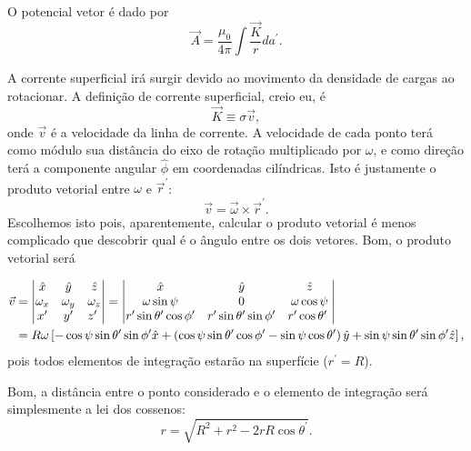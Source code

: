 \documentclass{article}
\newcommand{\rcaligrafico}{r}
\begin{document}
O potencial vetor é dado por
\begin{equation}
 \vec{A} = \frac{\mu_0}{4 \pi} \int \frac{\vec{K}}{\rcaligrafico} da^{\prime}.
\end{equation}

A corrente superficial irá surgir devido ao movimento da densidade de cargas ao rotacionar. A definição de corrente superficial, creio eu, é
\begin{equation}
 \vec{K} \equiv \sigma \vec{v},
\end{equation}
onde $\vec{v}$ é a velocidade da linha de corrente. A velocidade de cada ponto terá como módulo sua distância do eixo de rotação multiplicado por $\omega$, e como direção
terá a componente angular $\hat{\phi}$ em coordenadas cilíndricas. Isto é justamente o produto vetorial entre $\omega$ e $\vec{r}^{\prime}$:
\begin{equation}
 \vec{v} = \vec{\omega} \times \vec{r}^{\prime}.
\end{equation}
Escolhemos isto pois, aparentemente, calcular o produto vetorial é menos complicado que descobrir qual é o ângulo entre os dois vetores. Bom, o produto vetorial será

\begin{align}
\vec{v} &=
\begin{vmatrix}
\hat{x} & \hat{y} & \hat{z} \\ 
\omega_x & \omega_y & \omega_z \\ 
x^{\prime} & y^{\prime} & z^{\prime} \ \notag
\end{vmatrix}
=
\begin{vmatrix}
\hat{x} & \hat{y} & \hat{z} \\ 
\omega\sin{\psi} & 0 & \omega\cos{\psi} \\ 
r^{\prime}\sin{\theta^{\prime}}\cos{\phi^{\prime}} & r^{\prime}\sin{\theta^{\prime}}\sin{\phi^{\prime}} & r^{\prime}\cos{\theta^{\prime}} \ \notag
\end{vmatrix}\\
&=
R\omega \left[ -\cos{\psi}\sin{\theta^{\prime}}\sin{\phi^{\prime}} \hat{x} + \left( \cos{\psi}\sin{\theta^{\prime}}\cos{\phi^{\prime}} -
\sin{\psi}\cos{\theta^{\prime}}\right) \hat{y} + \sin{\psi}\sin{\theta^{\prime}\sin{\phi^{\prime}}} \hat{z}\right],
\end{align}
pois todos elementos de integração estarão na superfície ($r^{\prime} = R$).

Bom, a distância entre o ponto considerado e o elemento de integração será simplesmente a lei dos cossenos:
\begin{equation}
 \rcaligrafico = \sqrt{R^2 + r^{2} - 2rR\cos{\theta^{\prime}}}.
\end{equation}
\end{document}
